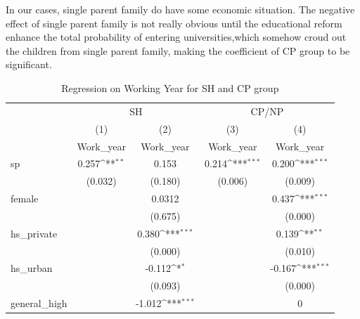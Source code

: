 \documentclass[]{AEA}
\def\sym#1{\ifmmode^{#1}\else\(^{#1}\)\fi}
\begin{document}
    In our cases, single parent family do have some economic situation. The negative effect of single parent family is not really obvious until the educational reform enhance the total probability of entering universities,which somehow croud out the children from single parent family, making the coefficient of CP group to be significant.
    
    \begin{center}
        \begin{table}
        \caption{Regression on Working Year for SH and CP group}
        \setlength{\tabcolsep}{0.5mm}
        \begin{tabular}{l*{4}c}
        \toprule
        &\multicolumn{2}{c}{SH} &\multicolumn{2}{c}{CP/NP} \\
        \cmidrule(l){2-3}\cmidrule(l){4-5}
        &\multicolumn{1}{c}{(1)}&\multicolumn{1}{c}{(2)}&\multicolumn{1}{c}{(3)}&\multicolumn{1}{c}{(4)}\\
        &\multicolumn{1}{c}{Work\_year}&\multicolumn{1}{c}{Work\_year}&\multicolumn{1}{c}{Work\_year}&\multicolumn{1}{c}{Work\_year}\\
        \midrule
        sp          &       0.257\sym{**} &       0.153         &       0.214\sym{***}&       0.200\sym{***}\\
                    &     (0.032)         &     (0.180)         &     (0.006)         &     (0.009)         \\
        [1em]
        female      &                     &      0.0312         &                     &       0.437\sym{***}\\
                    &                     &     (0.675)         &                     &     (0.000)         \\
        [1em]
        hs\_private  &                     &       0.380\sym{***}&                     &       0.139\sym{**} \\
                    &                     &     (0.000)         &                     &     (0.010)         \\
        [1em]
        hs\_urban    &                     &      -0.112\sym{*}  &                     &      -0.167\sym{***}\\
                    &                     &     (0.093)         &                     &     (0.000)         \\
        [1em]
        general\_high&                     &      -1.012\sym{***}&                     &           0         \\

\end{tabular}
\end{table}
\end{center}
\end{document}
